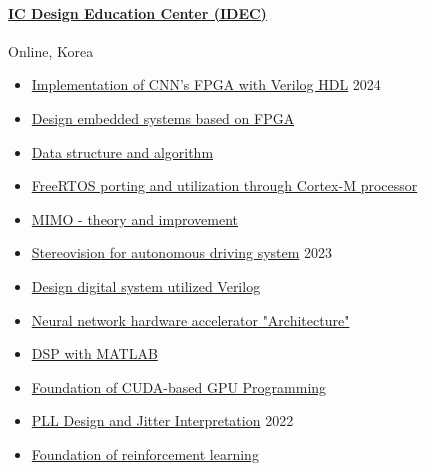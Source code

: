 \documentclass[a4paper,9pt]{extarticle}
\begin{document}
\paragraph{\large{\href{https://www.idec.or.kr/main/}{IC Design Education Center (IDEC)}}}  \hfill Online, Korea
\begin{itemize}
    \item \href{https://github.com/user-attachments/assets/234ad610-a051-4140-9f20-48ca4d8e4d42}{Implementation of CNN's FPGA with Verilog HDL}                         \hfill 2024
    \item \href{https://github.com/user-attachments/assets/68b0ae05-462b-4750-93ba-1bc4072dab66}{Design embedded systems based on FPGA}
    \item \href{https://github.com/user-attachments/assets/8fbda935-4b41-44f7-b83a-8d284f003168}{Data structure and algorithm}                                          
    \item \href{https://github.com/user-attachments/assets/805bbc13-3e6e-43d6-af75-df31f728d607}{FreeRTOS porting and utilization through Cortex-M processor}           
    \item \href{https://github.com/user-attachments/assets/707a4f8e-3b5a-4246-a763-81e2729f9cb2}{MIMO - theory and improvement}                                         
\end{itemize}

\begin{itemize}
    \item \href{https://github.com/user-attachments/assets/2d45999d-1f66-467c-b956-e16b5ed71593}{Stereovision for autonomous driving system}                            \hfill 2023
    \item \href{https://github.com/user-attachments/assets/32bfc1d6-18cf-44a4-83dc-209b4f4686ac}{Design digital system utilized Verilog}
    \item \href{https://github.com/user-attachments/assets/094a58df-f320-45fb-aba3-707f4a7fd8f7}{Neural network hardware accelerator "Architecture"}
    \item \href{https://github.com/user-attachments/assets/9f74252d-eae5-40b2-b305-ea90576100aa}{DSP with MATLAB}
    \item \href{https://github.com/user-attachments/assets/0fc8c167-bef1-4857-a664-a1b82c95e306}{Foundation of CUDA-based GPU Programming}    
\end{itemize}
\begin{itemize}
    \item \href{https://github.com/user-attachments/assets/b4e013f1-d7b8-4505-a4f5-12e270097549}{PLL Design and Jitter Interpretation}                                  \hfill 2022
    \item \href{https://github.com/user-attachments/assets/73933790-2b15-46ae-8ac2-c6eaf31d9e01}{Foundation of reinforcement learning}                                  
\end{itemize}
\end{document}

